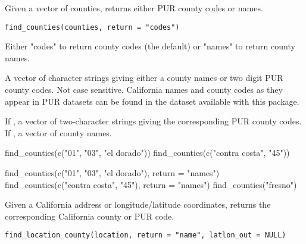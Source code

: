 \documentclass[a4paper]{book}
\begin{document}
%
\begin{Description}\relax
Given a vector of counties,  returns either PUR
county codes or names.
\end{Description}
%
\begin{Usage}
\begin{verbatim}
find_counties(counties, return = "codes")
\end{verbatim}
\end{Usage}
%
\begin{Arguments}
\begin{ldescription}
\item[\code{return}] Either "codes" to return county codes (the default) or "names"
to return county names.

\item[\code{county}] A vector of character strings giving either a county names or
two digit PUR county codes. Not case sensitive. California names and county
codes as they appear in PUR datasets can be found in the 
dataset available with this package.
\end{ldescription}
\end{Arguments}
%
\begin{Value}
If , a vector of two-character strings giving
the corresponding PUR county codes. If , a vector
of county names.
\end{Value}
%
\begin{Examples}
\begin{ExampleCode}
find_counties(c("01", "03", "el dorado"))
find_counties(c("contra costa", "45"))

find_counties(c("01", "03", "el dorado"), return = "names")
find_counties(c("contra costa", "45"), return = "names")
find_counties("fresno")
\end{ExampleCode}
\end{Examples}
%
\begin{Description}\relax
Given a California address or longitude/latitude coordinates,
 returns the corresponding California county or
PUR code.
\end{Description}
%
\begin{Usage}
\begin{verbatim}
find_location_county(location, return = "name", latlon_out = NULL)
\end{verbatim}
\end{Usage}
\end{document}
